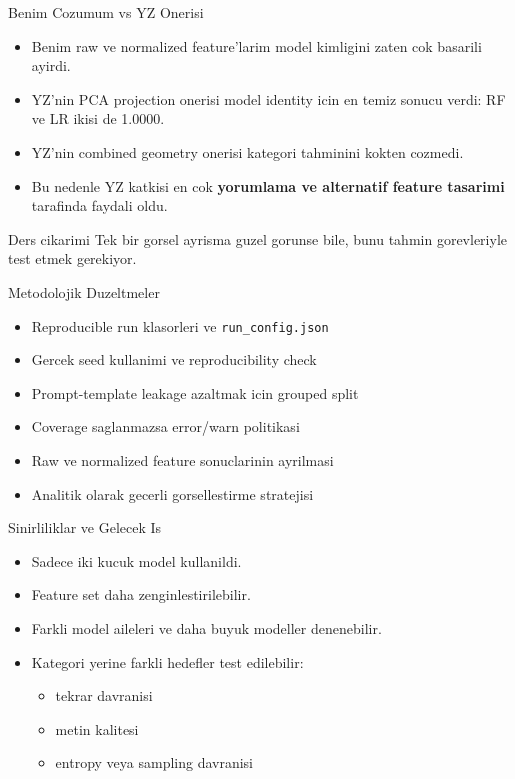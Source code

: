 \documentclass[aspectratio=169]{beamer}
\begin{document}
\begin{frame}{Benim Cozumum vs YZ Onerisi}
  \begin{itemize}
    \item Benim raw ve normalized feature'larim model kimligini zaten cok basarili ayirdi.
    \item YZ'nin PCA projection onerisi model identity icin en temiz sonucu verdi: RF ve LR ikisi de 1.0000.
    \item YZ'nin combined geometry onerisi kategori tahminini kokten cozmedi.
    \item Bu nedenle YZ katkisi en cok \textbf{yorumlama ve alternatif feature tasarimi} tarafinda faydali oldu.
  \end{itemize}

  \vspace{0.5em}
  \begin{block}{Ders cikarimi}
    Tek bir gorsel ayrisma guzel gorunse bile, bunu tahmin gorevleriyle test etmek gerekiyor.
  \end{block}
\end{frame}

\begin{frame}{Metodolojik Duzeltmeler}
  \begin{itemize}
    \item Reproducible run klasorleri ve \texttt{run\_config.json}
    \item Gercek seed kullanimi ve reproducibility check
    \item Prompt-template leakage azaltmak icin grouped split
    \item Coverage saglanmazsa error/warn politikasi
    \item Raw ve normalized feature sonuclarinin ayrilmasi
    \item Analitik olarak gecerli gorsellestirme stratejisi
  \end{itemize}
\end{frame}

\begin{frame}{Sinirliliklar ve Gelecek Is}
  \begin{itemize}
    \item Sadece iki kucuk model kullanildi.
    \item Feature set daha zenginlestirilebilir.
    \item Farkli model aileleri ve daha buyuk modeller denenebilir.
    \item Kategori yerine farkli hedefler test edilebilir:
      \begin{itemize}
        \item tekrar davranisi
        \item metin kalitesi
        \item entropy veya sampling davranisi
      \end{itemize}
  \end{itemize}
\end{frame}
\end{document}
